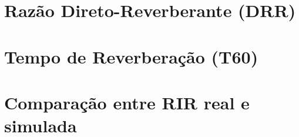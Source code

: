 \section{Razão Direto-Reverberante (DRR)}

\section{Tempo de Reverberação (T60)}

\section{Comparação entre RIR real e simulada}